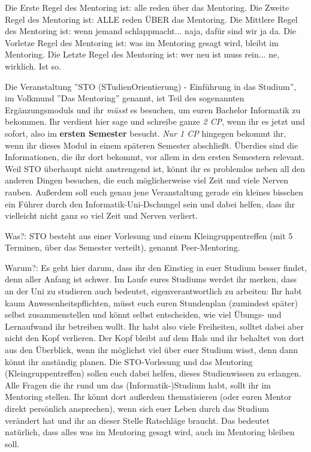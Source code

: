 Die Erste Regel des Mentoring ist: alle reden über das Mentoring.
Die Zweite Regel des Mentoring ist: ALLE reden ÜBER das Mentoring.
Die Mittlere Regel des Mentoring ist: wenn jemand schlappmacht... naja, dafür sind wir ja da.
Die Vorletze Regel des Mentoring ist: was im Mentoring gesagt wird, bleibt im Mentoring.
Die Letzte Regel des Mentoring ist: wer neu ist muss rein... ne, wirklich. Ist so.

Die Veranstaltung ''STO (STudienOrientierung) - Einführung in das Studium'', im Volkmund ''Das Mentoring'' genannt, ist Teil des sogenannten Ergänzungsmoduls und ihr \emph{müsst} es besuchen, um euren Bachelor Informatik zu bekommen. Ihr verdient hier sage und schreibe ganze \emph{2 CP}, wenn ihr es jetzt und sofort, also im \textbf{ersten Semester} besucht. \emph{Nur 1 CP} hingegen bekommt ihr, wenn ihr dieses Modul in einem späteren Semester abschließt. Überdies sind die Informationen, die ihr dort bekommt, vor allem in den ersten Semestern relevant. Weil STO überhaupt nicht anstrengend ist, könnt ihr es problemlos neben all den anderen Dingen besuchen, die euch möglicherweise viel Zeit und viele Nerven rauben. Außerdem soll euch genau jene Veranstaltung gerade ein kleines bisschen ein Führer durch den Informatik-Uni-Dschungel sein und dabei helfen, dass ihr vielleicht nicht ganz so viel Zeit und Nerven verliert. 

Was?: STO besteht aus einer Vorlesung und einem Kleingruppentreffen (mit 5 Terminen, über das Semester verteilt), genannt Peer-Mentoring. 

Warum?: Es geht hier darum, dass ihr den Einstieg in euer Studium besser findet, denn aller Anfang ist schwer. Im Laufe eures Studiums werdet ihr merken, dass an der Uni zu studieren auch bedeutet, eigenverantwortlich zu arbeiten: Ihr habt kaum Anwesenheitspflichten, müsst euch euren Stundenplan (zumindest später) selbst zusammenstellen und könnt selbst entscheiden, wie viel Übungs- und Lernaufwand ihr betreiben wollt. 
Ihr habt also viele Freiheiten, solltet dabei aber nicht den Kopf verlieren. Der Kopf bleibt auf dem Hals und ihr behaltet von dort aus den Überblick, wenn ihr möglichst viel über euer Studium wisst, denn dann könnt ihr anständig planen.
Die STO-Vorlesung und das Mentoring (Kleingruppentreffen) sollen euch dabei helfen, dieses Studienwissen zu erlangen. Alle Fragen die ihr rund um das (Informatik-)Studium habt, sollt ihr im Mentoring stellen. Ihr könnt dort außerdem thematisieren (oder euren Mentor direkt persönlich ansprechen), wenn sich euer Leben durch das Studium verändert hat und ihr an dieser Stelle Ratschläge braucht. Das bedeutet natürlich, dass alles was im Mentoring gesagt wird, auch im Mentoring bleiben soll.

